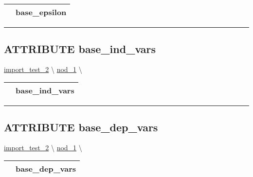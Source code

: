 {\renewcommand{\arraystretch}{1.5}
\begin{tabularx}{\textwidth}{|>{\raggedright\arraybackslash}l|X|}
\hline
\hspace{0pt}\mytexttt{\color{red} } & \textbf{base\_epsilon} \\
\hline
\end{tabularx}
}

\par


\rule{\linewidth}{0.5pt}
\subsection*{\textsf{\colorbox{headtoc}{\color{white} ATTRIBUTE}
base\_ind\_vars}}

\hypertarget{ecldoc:constants.base_ind_vars}{}
\hspace{0pt} \hyperlink{ecldoc:import_test_2}{import_test_2} \textbackslash 
\hspace{0pt} \hyperlink{ecldoc:Constants}{nod_1} \textbackslash 

{\renewcommand{\arraystretch}{1.5}
\begin{tabularx}{\textwidth}{|>{\raggedright\arraybackslash}l|X|}
\hline
\hspace{0pt}\mytexttt{\color{red} } & \textbf{base\_ind\_vars} \\
\hline
\end{tabularx}
}

\par


\rule{\linewidth}{0.5pt}
\subsection*{\textsf{\colorbox{headtoc}{\color{white} ATTRIBUTE}
base\_dep\_vars}}

\hypertarget{ecldoc:constants.base_dep_vars}{}
\hspace{0pt} \hyperlink{ecldoc:import_test_2}{import_test_2} \textbackslash 
\hspace{0pt} \hyperlink{ecldoc:Constants}{nod_1} \textbackslash 

{\renewcommand{\arraystretch}{1.5}
\begin{tabularx}{\textwidth}{|>{\raggedright\arraybackslash}l|X|}
\hline
\hspace{0pt}\mytexttt{\color{red} } & \textbf{base\_dep\_vars} \\
\hline
\end{tabularx}
}

